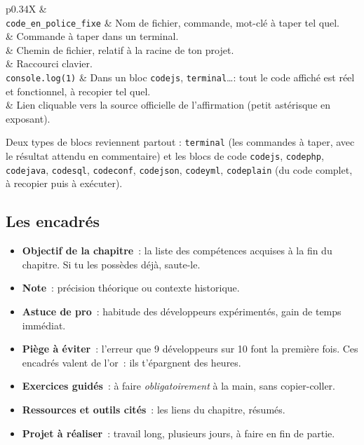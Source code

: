 \begin{tabz}{p{0.34\textwidth}X}
  \headrow {} \&  \\
  \midrule
  \verb|code_en_police_fixe| \& Nom de fichier, commande, mot-cl\'e \`a taper tel quel.\\
   \& Commande \`a taper dans un terminal.\\
   \& Chemin de fichier, relatif \`a la racine de ton projet.\\
   \& Raccourci clavier.\\
  \verb|console.log(1)| \& Dans un bloc \texttt{codejs}, \texttt{terminal}\dots : tout le code
  affich\'e est r\'eel et fonctionnel, \`a recopier tel quel.\\
   \& Lien cliquable vers la source
  officielle de l'affirmation (petit ast\'erisque en exposant).\\
\end{tabz}

Deux types de blocs reviennent partout : \verb|terminal| (les commandes \`a taper, avec le
r\'esultat attendu en commentaire) et les blocs de code \verb|codejs|, \verb|codephp|,
\verb|codejava|, \verb|codesql|, \verb|codeconf|, \verb|codejson|, \verb|codeyml|,
\verb|codeplain| (du code complet, \`a recopier puis \`a ex\'ecuter).

\subsection{Les encadr\'es}

\begin{itemize}
  \item \textbf{Objectif de la chapitre}~: la liste des comp\'etences acquises \`a la fin du chapitre.
        Si tu les poss\`edes d\'ej\`a, saute-le.
  \item \textbf{Note}~: pr\'ecision th\'eorique ou contexte historique.
  \item \textbf{Astuce de pro}~: habitude des d\'eveloppeurs exp\'eriment\'es, gain de temps imm\'ediat.
  \item \textbf{Pi\`ege \`a \'eviter}~: l'erreur que 9 d\'eveloppeurs sur 10 font la premi\`ere fois.
        Ces encadr\'es valent de l'or~: ils t'\'epargnent des heures.
  \item \textbf{Exercices guid\'es}~: \`a faire \emph{obligatoirement} \`a la main, sans copier-coller.
  \item \textbf{Ressources et outils cit\'es}~: les liens du chapitre, r\'esum\'es.
  \item \textbf{Projet \`a r\'ealiser}~: travail long, plusieurs jours, \`a faire en fin de partie.
\end{itemize}

